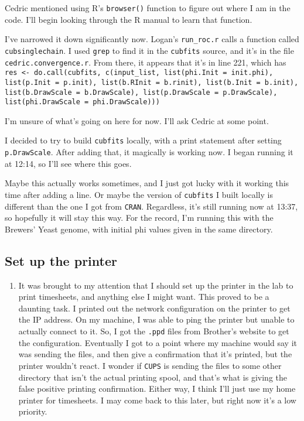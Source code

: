 \documentclass[12 pt]{article}
\begin{document}
\begin{enumerate}
				Cedric mentioned using R's \texttt{browser()} function to figure out where I am in the code. I'll begin looking through the R manual to learn that function.
				
				I've narrowed it down significantly now. Logan's \texttt{run\_roc.r} calls a function called \texttt{cubsinglechain}. I used \texttt{grep} to find it in the \texttt{cubfits} source, and it's in the file \texttt{cedric.convergence.r}. From there, it appears that it's in line 221, which has \texttt{res <- do.call(cubfits, c(input\_list, list(phi.Init = init.phi), list(p.Init = p.init), list(b.RInit = b.rinit), list(b.Init = b.init),
					list(b.DrawScale = b.DrawScale), list(p.DrawScale = p.DrawScale), list(phi.DrawScale = phi.DrawScale)))
					} 
					
				I'm unsure of what's going on here for now. I'll ask Cedric at some point.
				
				I decided to try to build \texttt{cubfits} locally, with a print statement after setting \texttt{p.DrawScale}. After adding that, it magically is working now. I began running it at 12:14, so I'll see where this goes. 
				
				Maybe this actually works sometimes, and I just got lucky with it working this time after adding a line. Or maybe the version of \texttt{cubfits} I built locally is different than the one I got from \texttt{CRAN}. Regardless, it's still running now at 13:37, so hopefully  it will stay this way. For the record, I'm running this with the Brewers' Yeast genome, with initial phi values given in the same directory.
 			\end{enumerate} 
 			
 		\subsection{Set up the printer}
 		\begin{enumerate}
		 	\item It was brought to my attention that I should set up the printer in the lab to print timesheets, and anything else I might want. This proved to be a daunting task. I printed out the network configuration on the printer to get the IP address. On my machine, I was able to ping the printer but unable to actually connect to it. So, I got the \texttt{.ppd} files from Brother's website to get the configuration. Eventually I got to a point where my machine would say it was sending the files, and then give a confirmation that it's printed, but the printer wouldn't react. I wonder if \texttt{CUPS} is sending the files to some other directory that isn't the actual printing spool, and that's what is giving the false positive printing confirmation. Either way, I think I'll just use my home printer for timesheets. I may come back to this later, but right now it's a low priority.
 		\end{enumerate}
\end{document}
